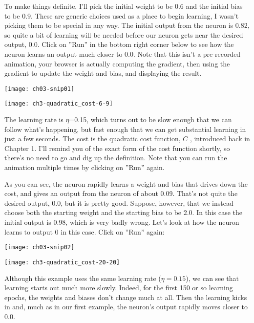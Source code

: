 To make things definite, I'll pick the initial weight to be 0.6 and the initial bias to be 0.9. These are generic choices used as a place to begin learning, I wasn't picking them to be special in any way. The initial output from the neuron is 0.82, so quite a bit of learning will be needed before our neuron gets near the desired output, 0.0. Click on ''Run'' in the bottom right corner below to see how the neuron learns an output much closer to 0.0. Note that this isn't a pre-recorded animation, your browser is actually computing the gradient, then using the gradient to update the weight and bias, and displaying the result. 
\begin{marginfigure}[-40mm]
\texttt{[image: ch03-snip01]}
\end{marginfigure}
\begin{marginfigure}
\texttt{[image: ch3-quadratic\_cost-6-9]}
\end{marginfigure}
The learning rate is $\eta$=0.15, which turns out to be slow enough that we can follow what's happening, but fast enough that we can get substantial learning in just a few seconds. The cost is the quadratic cost function, $C$ , introduced back in Chapter 1. I'll remind you of the exact form of the cost function shortly, so there's no need to go and dig up the definition. Note that you can run the animation multiple times by clicking on ''Run'' again.

As you can see, the neuron rapidly learns a weight and bias that drives down the cost, and gives an output from the neuron of about 0.09. That's not quite the desired output, 0.0, but it is pretty good. Suppose, however, that we instead choose both the starting weight and the starting bias to be 2.0. In this case the initial output is 0.98, which is very badly wrong. Let's look at how the neuron learns to output 0
in this case. Click on ''Run'' again:
\begin{marginfigure}
\texttt{[image: ch03-snip02]}
\end{marginfigure}
\begin{marginfigure}
\texttt{[image: ch3-quadratic\_cost-20-20]}
\end{marginfigure}


Although this example uses the same learning rate ($\eta=0.15$), we can see that learning starts out much more slowly. Indeed, for the first 150 or so learning epochs, the weights and biases don't change much at all. Then the learning kicks in and, much as in our first example, the neuron's output rapidly moves closer to 0.0.

